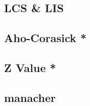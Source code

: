 \documentclass[a4paper,10pt,twocolumn,oneside]{article}
\begin{document}
\subsection{LCS \& LIS}


% 

% 

\subsection{Aho-Corasick *}


\subsection{Z Value *}


% 

\subsection{manacher}


% 

%

% 
\end{document}
